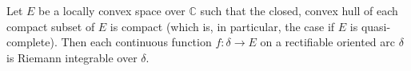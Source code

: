 Let $E$ be a locally convex space over $\mathbb{C}$ such that the closed, convex hull of each compact subset of $E$ is compact (which is, in particular, the case if $E$ is quasi-complete). Then each continuous function $f: \delta \rightarrow E$ on a rectifiable oriented arc $\delta$ is Riemann integrable over $\delta$.
